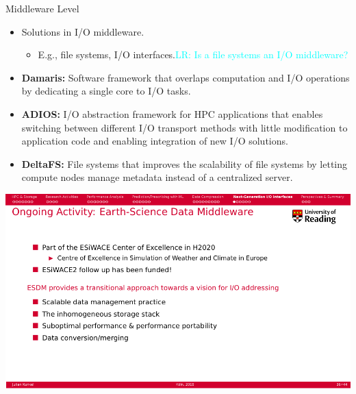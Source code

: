 \documentclass[compress,11pt,xcolor=svgnames,aspectratio=169]{beamer}
\newcommand{\lr}[1]{\textcolor{cyan}{LR: #1}}
\begin{document}
\begin{frame}[fragile]{Middleware Level}

\begin{itemize}
\setlength\itemsep{0.4cm}

\item Solutions in I/O middleware.

    \begin{itemize}

    \item E.g., file systems, I/O interfaces.\lr{Is a file systems an I/O middleware?}

    \end{itemize}

\item \textbf{Damaris:} Software framework that overlaps computation and I/O operations by dedicating a single core to I/O tasks.

\item \textbf{ADIOS:} I/O abstraction framework for HPC applications that enables switching between different I/O transport methods with little modification to application code and enabling integration of new I/O solutions.

\item \textbf{DeltaFS:} File systems that improves the scalability of file systems by letting compute nodes manage metadata instead of a centralized server.

\end{itemize}

\nocite{3372390}

\end{frame}

\begin{frame}[fragile]{}

\begin{center}
\includegraphics[scale=0.6]{fig/esdm-mid}
\end{center}

\end{frame}
\end{document}
